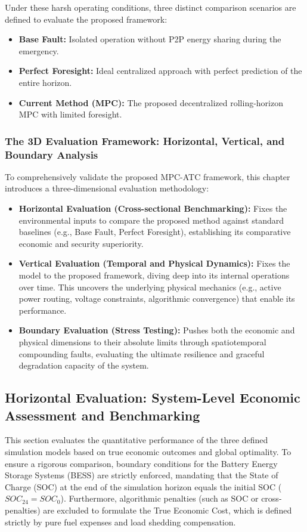 Under these harsh operating conditions, three distinct comparison scenarios are defined to evaluate the proposed framework:
\begin{itemize}
    \item \textbf{Base Fault:} Isolated operation without P2P energy sharing during the emergency.
    \item \textbf{Perfect Foresight:} Ideal centralized approach with perfect prediction of the entire horizon.
    \item \textbf{Current Method (MPC):} The proposed decentralized rolling-horizon MPC with limited foresight.
\end{itemize}

\subsubsection{The 3D Evaluation Framework: Horizontal, Vertical, and Boundary Analysis}

To comprehensively validate the proposed MPC-ATC framework, this chapter introduces a three-dimensional evaluation methodology:
\begin{itemize}
    \item \textbf{Horizontal Evaluation (Cross-sectional Benchmarking):} Fixes the environmental inputs to compare the proposed method against standard baselines (e.g., Base Fault, Perfect Foresight), establishing its comparative economic and security superiority.
    \item \textbf{Vertical Evaluation (Temporal and Physical Dynamics):} Fixes the model to the proposed framework, diving deep into its internal operations over time. This uncovers the underlying physical mechanics (e.g., active power routing, voltage constraints, algorithmic convergence) that enable its performance.
    \item \textbf{Boundary Evaluation (Stress Testing):} Pushes both the economic and physical dimensions to their absolute limits through spatiotemporal compounding faults, evaluating the ultimate resilience and graceful degradation capacity of the system.
\end{itemize}

\subsection{Horizontal Evaluation: System-Level Economic Assessment and Benchmarking}

This section evaluates the quantitative performance of the three defined simulation models based on true economic outcomes and global optimality. To ensure a rigorous comparison, boundary conditions for the Battery Energy Storage Systems (BESS) are strictly enforced, mandating that the State of Charge (SOC) at the end of the simulation horizon equals the initial SOC ($SOC_{24} = SOC_{0}$). Furthermore, algorithmic penalties (such as SOC or cross-penalties) are excluded to formulate the True Economic Cost, which is defined strictly by pure fuel expenses and load shedding compensation. 

